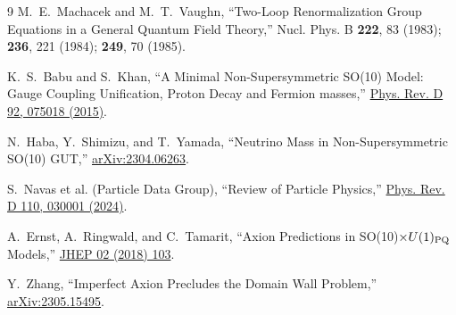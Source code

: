 \documentclass[11pt]{article}
\begin{document}
\small
\begin{thebibliography}{9}
M.~E.~Machacek and M.~T.~Vaughn,
``Two-Loop Renormalization Group Equations in a General Quantum Field
Theory,'' Nucl. Phys. B \textbf{222}, 83 (1983); \textbf{236}, 221 (1984);
\textbf{249}, 70 (1985).

K.~S.~Babu and S.~Khan,
``A Minimal Non-Supersymmetric SO(10) Model: Gauge Coupling Unification,
Proton Decay and Fermion masses,''
\href{https://arxiv.org/abs/1507.06712}{Phys. Rev. D 92, 075018 (2015)}.

N.~Haba, Y.~Shimizu, and T.~Yamada,
``Neutrino Mass in Non-Supersymmetric SO(10) GUT,''
\href{https://arxiv.org/abs/2304.06263}{arXiv:2304.06263}.

S.~Navas et al. (Particle Data Group),
``Review of Particle Physics,''
\href{https://pdg.lbl.gov/2024/}{Phys. Rev. D 110, 030001 (2024)}.

A.~Ernst, A.~Ringwald, and C.~Tamarit,
``Axion Predictions in SO(10)$\times U(1)_{\rm PQ}$ Models,''
\href{https://arxiv.org/abs/1801.04906}{JHEP 02 (2018) 103}.

Y.~Zhang,
``Imperfect Axion Precludes the Domain Wall Problem,''
\href{https://arxiv.org/abs/2305.15495}{arXiv:2305.15495}.
\end{thebibliography}
\end{document}
